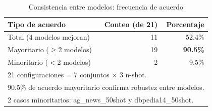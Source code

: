 \begin{table}[htbp]
\centering
\caption{Consistencia entre modelos: frecuencia de acuerdo}
\label{tab:embedding_consistency}
\begin{tabular}{lrr}
\toprule
\textbf{Tipo de acuerdo} & \textbf{Conteo (de 21)} & \textbf{Porcentaje} \\
\midrule
Total (4 modelos mejoran)          & 11 & 52.4\% \\
Mayoritario ($\geq$2 modelos)      & 19 & \textbf{90.5\%} \\
Minoritario ($<$2 modelos)          & 2  & 9.5\% \\
\midrule
\multicolumn{3}{l}{\small 21 configuraciones = 7 conjuntos $\times$ 3 n-shot.} \\
\multicolumn{3}{l}{\small 90.5\% de acuerdo mayoritario confirma robustez entre modelos.} \\
\multicolumn{3}{l}{\small 2 casos minoritarios: ag\_news\_50shot y dbpedia14\_50shot.} \\
\bottomrule
\end{tabular}
\end{table}
